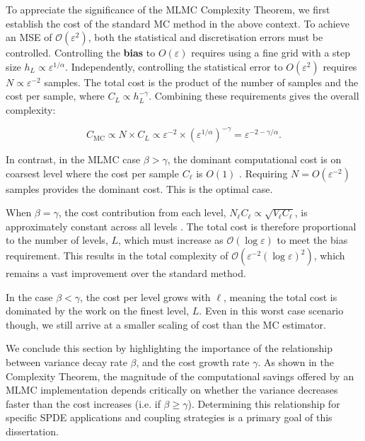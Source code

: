 To appreciate the significance of the MLMC Complexity Theorem, we first establish the cost of the 
standard MC method in the above context. To achieve an MSE of 
$\mathcal{O}(\varepsilon^2)$, both the statistical and discretisation errors must be controlled.
Controlling the \textbf{bias} to $O(\varepsilon)$ requires using a fine grid with a 
step size $h_L \propto \varepsilon^{1/\alpha}$. Independently, controlling the 
statistical error to $O(\varepsilon^2)$ requires 
$N \propto \varepsilon^{-2}$ samples. The total cost is the product of the number of 
samples and the cost per sample, where $C_L \propto h_L^{-\gamma}$. Combining these 
requirements gives the overall complexity:

$$
C_{\mathrm{MC}} \propto N \times C_L \propto \varepsilon^{-2} 
\times (\varepsilon^{1/\alpha})^{-\gamma} = \varepsilon^{-2-\gamma/\alpha}.
$$

In contrast, in the MLMC case $\beta > \gamma$, the dominant computational
cost is on coarsest level where the cost per sample $C_\ell$ is $O(1)$ 
\cite{giles2015multilevel}.
Requiring $N = O(\varepsilon^{-2})$ samples provides the dominant cost. This is the optimal 
case.

When $\beta = \gamma$, the cost contribution from each level, 
$N_\ell C_\ell \propto \sqrt{V_\ell C_\ell}$, is approximately constant across 
all levels \cite{giles2015multilevel}. The total cost is therefore proportional to the 
number of levels, $L$, which must increase as $\mathcal{O}(\log \varepsilon)$ to 
meet the bias requirement. This results in the total complexity of 
$\mathcal{O}(\varepsilon^{-2}(\log \varepsilon)^2)$, which remains a vast 
improvement over the standard method.

In the case $\beta < \gamma$, the cost per level grows with $\ell$, meaning 
the total cost is dominated by the work on the finest level, $L$. 
Even in this worst case scenario though, we still arrive at a smaller scaling of cost 
than the MC estimator. 

We conclude this section by highlighting the importance of the relationship
between variance decay rate $\beta$, and the cost growth rate $\gamma$. 
As shown in the Complexity Theorem, the magnitude of the computational savings 
offered by an MLMC implementation depends critically on whether the variance 
decreases faster than the cost increases (i.e. if $\beta \ge \gamma$). 
Determining this relationship for specific SPDE applications and coupling 
strategies is a primary goal of this dissertation.
